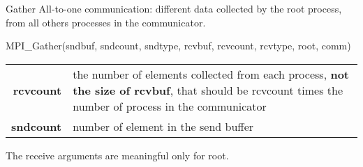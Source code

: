 \documentclass[aspectratio=43]{beamer}
\begin{document}


\begin{frame}[fragile]{Gather}
All-to-one communication: different data collected by the root process, from all others processes in the communicator.\\
\begin{Pseudolisting}[]{}
MPI_Gather(sndbuf, sndcount, sndtype,
           rcvbuf, rcvcount, rcvtype, root, comm)
\end{Pseudolisting}
\begin{black1block}{}
\begin{tabular}{rp{8cm}}
    \textbf{rcvcount} & the number of elements collected from each process, {\textbf{not the size of rcvbuf}}, that should be rcvcount times the number of process in the communicator\\
\textbf{sndcount} & number of element in the send buffer\\
\end{tabular}
\end{black1block}
The receive arguments are meaningful only for root.
\end{frame}
\end{document}
